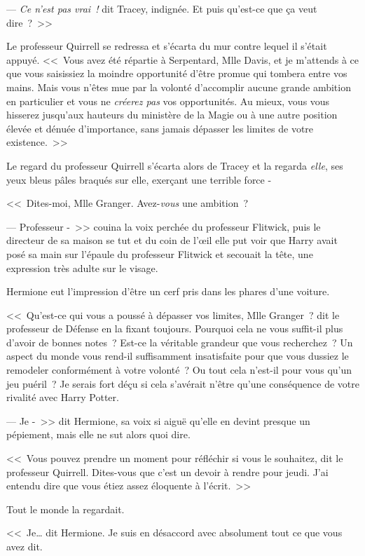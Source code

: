 --- \emph{Ce n'est pas vrai~!}  dit Tracey, indignée. Et puis qu'est-ce que ça veut dire~?~>>

Le professeur Quirrell se redressa et s'écarta du mur contre lequel il s'était appuyé. <<~Vous avez été répartie à Serpentard, Mlle Davis, et je m'attends à ce que vous saisissiez la moindre opportunité d'être promue qui tombera entre vos mains. Mais vous n'êtes mue par la volonté d'accomplir aucune grande ambition en particulier et vous ne \emph{créerez pas} vos opportunités. Au mieux, vous vous hisserez jusqu'aux hauteurs du ministère de la Magie ou à une autre position élevée et dénuée d'importance, sans jamais dépasser les limites de votre existence.~>>

Le regard du professeur Quirrell s'écarta alors de Tracey et la regarda \emph{elle}, ses yeux bleus pâles braqués sur elle, exerçant une terrible force -

<<~Dites-moi, Mlle Granger. Avez-\emph{vous} une ambition~?

--- Professeur -~>> couina la voix perchée du professeur Flitwick, puis le directeur de sa maison se tut et du coin de l'œil elle put voir que Harry avait posé sa main sur l'épaule du professeur Flitwick et secouait la tête, une expression très adulte sur le visage.

Hermione eut l'impression d'être un cerf pris dans les phares d'une voiture.

<<~Qu'est-ce qui vous a poussé à dépasser vos limites, Mlle Granger~? dit le professeur de Défense en la fixant toujours. Pourquoi cela ne vous suffit-il plus d'avoir de bonnes notes~? Est-ce la véritable grandeur que vous recherchez~? Un aspect du monde vous rend-il suffisamment insatisfaite pour que vous dussiez le remodeler conformément à votre volonté~? Ou tout cela n'est-il pour vous qu'un jeu puéril~? Je serais fort déçu si cela s'avérait n'être qu'une conséquence de votre rivalité avec Harry Potter.

--- Je -~>> dit Hermione, sa voix si aiguë qu'elle en devint presque un pépiement, mais elle ne sut alors quoi dire.

<<~Vous pouvez prendre un moment pour réfléchir si vous le souhaitez, dit le professeur Quirrell. Dites-vous que c'est un devoir à rendre pour jeudi. J'ai entendu dire que vous étiez assez éloquente à l'écrit.~>>

Tout le monde la regardait.

<<~Je… dit Hermione. Je suis en désaccord avec absolument tout ce que vous avez dit.

